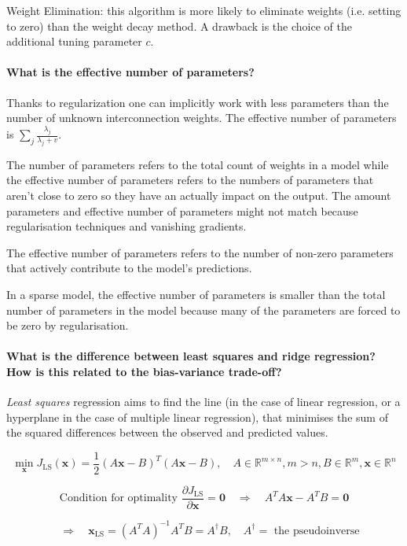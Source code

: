 Weight Elimination: this algorithm is more likely to eliminate weights
(i.e. setting to zero) than the weight decay method.
A drawback is the choice of the additional tuning parameter $c$.

\paragraph{What is the effective number of parameters?}

Thanks to regularization one can implicitly work with less parameters
than the number of unknown interconnection weights.
The effective number of parameters is $\sum_j{\frac{\lambda_j}{\lambda_j + v}}$.

The number of parameters refers to the total count of weights in a model while the effective number
of parameters refers to the numbers of parameters that aren't close to zero so they have an actually
impact on the output. The amount parameters and effective number of parameters might not match
because regularisation techniques and vanishing gradients.

The effective number of parameters refers to the number of non-zero
parameters that actively contribute to the model's predictions.

In a sparse model, the effective number of parameters is smaller than the
total number of parameters in the model because many of the parameters are
forced to be zero by regularisation.

\paragraph{What is the difference between least squares and ridge regression?
How is this related to the bias-variance trade-off?}

\textit{Least squares} regression aims to find the line (in the case of linear regression,
or a hyperplane in the case of multiple linear regression), that minimises
the sum of the squared differences between the observed and predicted values.

$$
\min_{\bm{x}}{J_\text{LS}(\bm{x})} = \frac{1}{2} (A\bm{x} - B)^T (A\bm{x} - B),
\quad A \in \mathbb{R}^{m \times n}, m > n, B \in \mathbb{R}^m, \bm{x} \in \mathbb{R}^n
$$

$$
\text{Condition for optimality } \frac{\partial J_\text{LS}}{\partial \bm{x}} = \bm{0}
\quad \Rightarrow \quad
A^T A \bm{x} - A^T B = \bm{0}
$$

$$
\quad \Rightarrow \quad
\bm{x}_\text{LS} = (A^T A)^{-1} A^T B = A^\dagger B, \quad A^\dagger = \text{ the pseudoinverse}
$$

